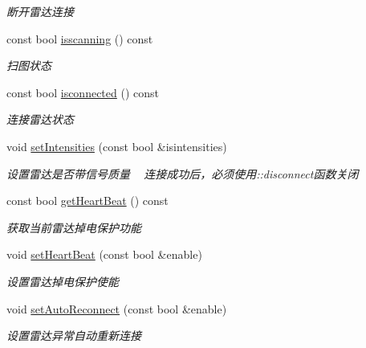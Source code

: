 \begin{DoxyCompactItemize}
\begin{DoxyCompactList}\small\item\em 断开雷达连接 \end{DoxyCompactList}\item 
const bool \hyperlink{classydlidar_1_1_y_dlidar_driver_a37cd2766dec3536848aa25c88d9d1ea9}{isscanning} () const 
\begin{DoxyCompactList}\small\item\em 扫图状态 ~\newline
\end{DoxyCompactList}\item 
const bool \hyperlink{classydlidar_1_1_y_dlidar_driver_a2553d28304faa4acab6bd63e7c6c2ee6}{isconnected} () const 
\begin{DoxyCompactList}\small\item\em 连接雷达状态 ~\newline
\end{DoxyCompactList}\item 
void \hyperlink{classydlidar_1_1_y_dlidar_driver_afc543dbbe1c5e37afc366e3c92203533}{set\+Intensities} (const bool \&isintensities)
\begin{DoxyCompactList}\small\item\em 设置雷达是否带信号质量 ~\newline
连接成功后，必须使用\+::disconnect函数关闭 \end{DoxyCompactList}\item 
const bool \hyperlink{classydlidar_1_1_y_dlidar_driver_a36b01c5124032be12ecbeffeefd38742}{get\+Heart\+Beat} () const 
\begin{DoxyCompactList}\small\item\em 获取当前雷达掉电保护功能 ~\newline
\end{DoxyCompactList}\item 
void \hyperlink{classydlidar_1_1_y_dlidar_driver_af5d6603d3664d3efcb56d64d76d31956}{set\+Heart\+Beat} (const bool \&enable)
\begin{DoxyCompactList}\small\item\em 设置雷达掉电保护使能 ~\newline
\end{DoxyCompactList}\item 
void \hyperlink{classydlidar_1_1_y_dlidar_driver_a6de3ec3e2b2837f0459f1ce35257323a}{set\+Auto\+Reconnect} (const bool \&enable)
\begin{DoxyCompactList}\small\item\em 设置雷达异常自动重新连接 ~\newline

\end{DoxyCompactList}
\end{DoxyCompactItemize}
